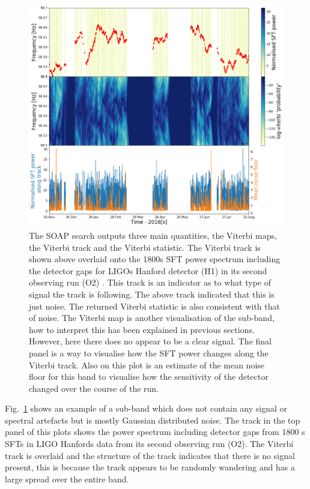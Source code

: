 \begin{figure}
	\centering
	\includegraphics[width=\textwidth]{C5_detchar/track_F58_5_58_7_noise.png}
	\caption{The SOAP search outputs three main quantities, the Viterbi maps, the Viterbi track and the Viterbi statistic. The Viterbi track is shown above overlaid onto the 1800s \ac{SFT} power spectrum including the detector gaps for \acp{LIGO} Hanford detector (H1) in its second observing run (O2) \citep{}. This track is an indicator as to what type of signal the track is following. The above track indicated that this is just noise. The returned Viterbi statistic is also consistent with that of noise. The Viterbi map is another visualisation of the sub-band, how to interpret this has been explained in previous sections. However, here there does no appear to be a clear signal. The final panel is a way to visualise how the \ac{SFT} power changes along the Viterbi track. Also on this plot is an estimate of the mean noise floor for this band to visualise how the sensitivity of the detector changed over the course of the run. }
	\label{detchar:soap:noiseplot}
\end{figure}
%
Fig.~\ref{detchar:soap:noiseplot} shows an example of a sub-band which does not contain any signal or spectral artefacts but is mostly Gaussian distributed noise. 
The track in the top panel of this plots shows the power spectrum including detector gaps from 1800 s \acp{SFT} in \ac{LIGO} Hanfords data from its second observing run (O2). 
The Viterbi track is overlaid and the structure of the track indicates that there is no signal present, this is because the track appears to be randomly wandering and has a large spread over the entire band. 
